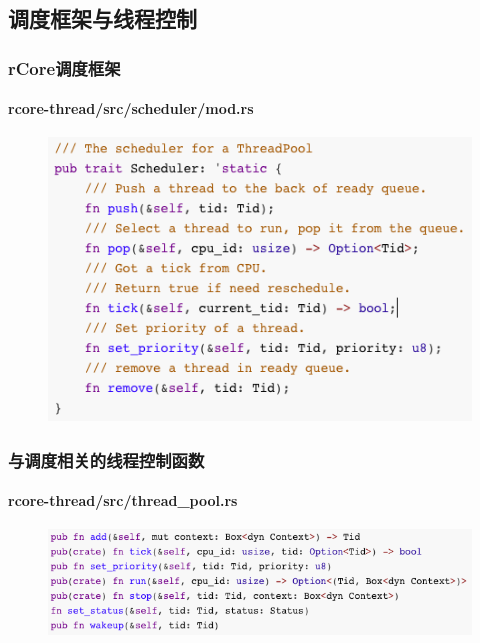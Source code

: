 \subsection{调度框架与线程控制} %
\begin{frame}[fragile]
    \frametitle{rCore调度框架}
    \framesubtitle{rcore-thread/src/scheduler/mod.rs}
    \begin{figure}
    \includegraphics[width=0.65\linewidth]{figs/Scheduler.png}
    \end{figure}
\end{frame}
% 
% 
% 
% 
\begin{frame}[fragile]
    \frametitle{与调度相关的线程控制函数}
    \framesubtitle{rcore-thread/src/thread\_pool.rs}
    \begin{figure}
    \includegraphics[width=1.0\linewidth]{figs/thread-pool-scheduler.png}
    \end{figure}
\end{frame}
